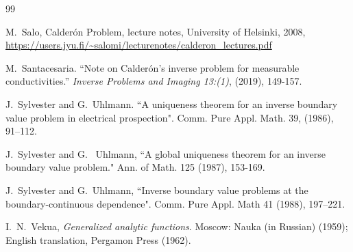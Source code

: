 \documentclass[12pt]{article}
\begin{document}
\begin{thebibliography}{99}

M.~Salo, Calderón Problem, lecture notes, University of Helsinki, 2008, \url{https://users.jyu.fi/~salomi/lecturenotes/calderon_lectures.pdf}
  
M.~Santacesaria. ``Note on Calderón's inverse problem for measurable conductivities.'' {\em Inverse Problems and Imaging 13:(1)}, (2019), 149-157.




 J.~Sylvester and G.~Uhlmann. ``A uniqueness theorem for an inverse
boundary value problem in electrical prospection". Comm. Pure Appl. Math. 39, (1986), 91–112.

 J.~Sylvester and G.~ Uhlmann, ``A global uniqueness theorem for an inverse boundary value problem." Ann. of Math. 125 (1987), 153-169.

 J.~Sylvester and G.~Uhlmann, ``Inverse boundary value problems at the boundary-continuous dependence". Comm. Pure Appl. Math 41 (1988), 197–221.


 I.~N.~Vekua,  {\em Generalized analytic
    functions}.  Moscow: Nauka (in Russian) (1959); English translation, 
   Pergamon Press (1962). %


\end{thebibliography}
\end{document}
